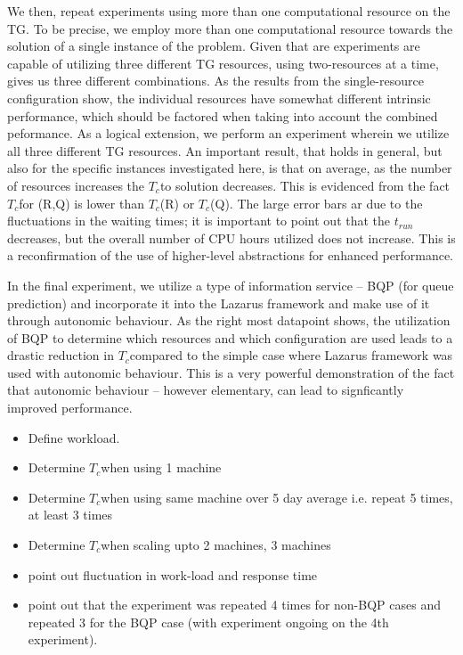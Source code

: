 \documentclass[conference,final]{IEEEtran}
\newcommand{\tc}{$T_c$}
\begin{document}
We then, repeat experiments using more than one computational resource
on the TG. To be precise, we employ more than one computational
resource towards the solution of a single instance of the problem.
Given that are experiments are capable of utilizing three different TG
resources, using two-resources at a time, gives us three different
combinations. As the results from the single-resource configuration
show, the individual resources have somewhat different intrinsic
performance, which should be factored when taking into account the
combined peformance. As a logical extension, we perform an experiment
wherein we utilize all three different TG resources.  An important
result, that holds in general, but also for the specific instances
investigated here, is that on average, as the number of resources
increases the \tc to solution decreases. This is evidenced from the
fact \tc for (R,Q) is lower than \tc (R) or \tc (Q). The large error
bars ar due to the fluctuations in the waiting times; it is important
to point out that the $t_{run}$ decreases, but the overall number of
CPU hours utilized does not increase. This is a reconfirmation of
the use of higher-level abstractions for enhanced performance.

In the final experiment, we utilize a type of information service --
BQP (for queue prediction) and incorporate it into the Lazarus
framework and make use of it through autonomic behaviour.  As the
right most datapoint shows, the utilization of BQP to determine which
resources and which configuration are used leads to a drastic
reduction in \tc compared to the simple case where Lazarus framework
was used with autonomic behaviour. This is a very powerful
demonstration of the fact that autonomic behaviour -- however
elementary, can lead to signficantly improved performance.

\begin{itemize}
\item Define workload.
\item Determine  \tc when using 1 machine 
\item Determine \tc when using same machine over 5 day average i.e. repeat 5    times, at least 3 times
\item Determine \tc when scaling upto 2 machines, 3 machines 
\item point out fluctuation in work-load and response time
\item point out that the experiment was repeated 4 times for non-BQP
  cases and repeated 3 for the BQP case (with experiment ongoing on
  the 4th experiment).
\end{itemize}
\end{document}
